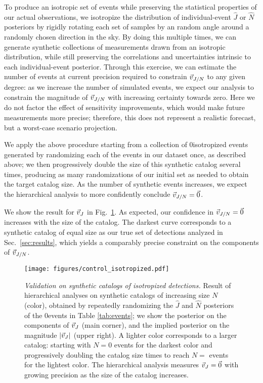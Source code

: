 \documentclass[aps,prd,twocolumn,superscriptaddress,preprintnumbers,floatfix,nofootinbib]{revtex4-2}
\newcommand{\Nevents}{0}
\newcommand{\Niteriso}{}
\newcommand{\Nmaxiso}{}
\begin{document}
To produce an isotropic set of events while preserving the statistical properties of our actual observations, we isotropize the distribution of individual-event $\hat{J}$ or $\hat{N}$ posteriors by rigidly rotating each set of samples by an random angle around a randomly chosen direction in the sky.
By doing this multiple times, we can generate synthetic collections of measurements drawn from an isotropic distribution, while still preserving the correlations and uncertainties intrinsic to each individual-event posterior.
Through this exercise, we can estimate the number of events at current precision required to constrain $\vec{v}_{J/N}$ to any given degree: as we increase the number of simulated events, we expect our analysis to constrain the magnitude of $\vec{v}_{J/N}$ with increasing certainty towards zero.
Here we do not factor the effect of sensitivity improvements, which would make future measurements more precise; therefore, this does not represent a realistic forecast, but a worst-case scenario projection.

We apply the above procedure starting from a collection of \Nevents isotropized events generated by randomizing each of the events in our dataset once, as described above; we then progressively double the size of this synthetic catalog several times, producing as many randomizations of our initial set as needed to obtain the target catalog size.
As the number of synthetic events increases, we expect the hierarchical analysis to more confidently conclude $\vec{v}_{J/N} = \vec{0}$.

We show the result for $\vec{v}_{J}$ in Fig.~\ref{fig:control-iso}.
As expected, our confidence in $\vec{v}_{J/N} = \vec{0}$ increases with the size of the catalog.
The darkest curve corresponds to a synthetic catalog of equal size as our true set of detections analyzed in Sec.~\ref{sec:results}, which yields a comparably precise constraint on the components of $\vec{v}_{J/N}$.

\begin{figure}
\texttt{[image: figures/control\_isotropized.pdf]}
\caption{\emph{Validation on synthetic catalogs of isotropized detections.}
Result of hierarchical analyses on synthetic catalogs of increasing size $N$ (color), obtained by repeatedly randomizing the $\hat{J}$ and $\hat{N}$ posteriors of the \Nevents events in Table \ref{tab:events}; we show the posterior on the components of $\vec{v}_{J}$ (main corner), and the implied posterior on the magnitude $|\vec{v}_{J}|$ (upper right).
A lighter color corresponds to a larger catalog: starting with $N = \Nevents$ events for the darkest color and progressively doubling the catalog size \Niteriso times to reach $N = \Nmaxiso$ events for the lightest color.
The hierarchical analysis measures $\vec{v}_{J} = \vec{0}$ with growing precision as the size of the catalog increases.
}
\label{fig:control-iso}
\end{figure}
\end{document}
